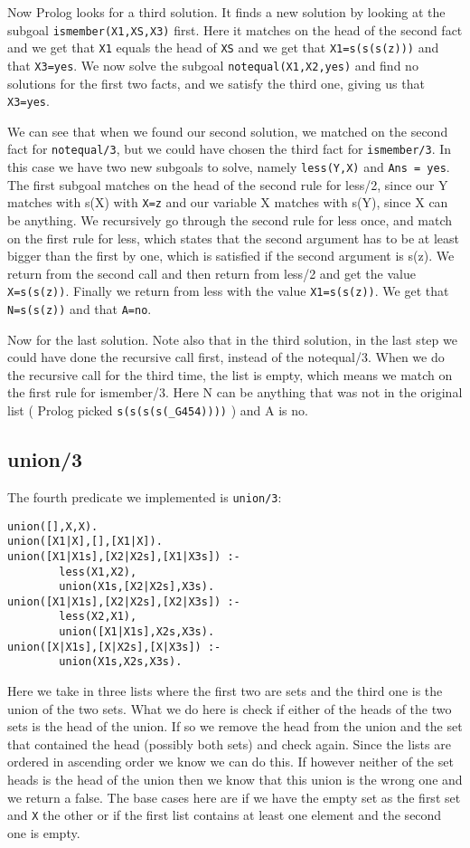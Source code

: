 \documentclass[a4paper,10pt]{article}
\begin{document}
Now Prolog looks for a third solution. It finds a new solution by looking at the subgoal \verb=ismember(X1,XS,X3)= first. Here it matches on the head of the second fact and we get that \verb=X1= equals the head of \verb=XS= and we get that \verb!X1=s(s(s(z)))! and that \verb!X3=yes!. We now solve the subgoal \verb=notequal(X1,X2,yes)= and find no solutions for the first two facts, and we satisfy the third one, giving us that \verb!X3=yes!.

We can see that when we found our second solution, we matched on the second fact for \verb=notequal/3=, but we could have chosen the third fact for \verb=ismember/3=. In this case we have two new subgoals to solve, namely \verb=less(Y,X)= and \verb!Ans = yes!. The first subgoal matches on the head of the second rule for less/2, since our Y matches with s(X) with \verb!X=z! and our variable X matches with s(Y), since X can be anything. We recursively go through the second rule for less once, and match on the first rule for less, which states that the second argument has to be at least bigger than the first by one, which is satisfied if the second argument is s(z). We return from the second call and then return from less/2 and get the value \verb!X=s(s(z))!. Finally we return from less with the value \verb!X1=s(s(z))!. We get that \verb!N=s(s(z))! and that \verb!A=no!.

Now for the last solution. Note also that in the third solution, in the last step we could have done the recursive call first, instead of the notequal/3. When we do the recursive call for the third time, the list is empty, which means we match on the first rule for ismember/3. Here N can be anything that was not in the original list ( Prolog picked \verb=s(s(s(s(_G454))))= ) and A is no.

\subsection{union/3}
The fourth predicate we implemented is \verb=union/3=:
\begin{verbatim}
union([],X,X).
union([X1|X],[],[X1|X]).
union([X1|X1s],[X2|X2s],[X1|X3s]) :-
        less(X1,X2),
        union(X1s,[X2|X2s],X3s).
union([X1|X1s],[X2|X2s],[X2|X3s]) :-
        less(X2,X1),
        union([X1|X1s],X2s,X3s).
union([X|X1s],[X|X2s],[X|X3s]) :-
        union(X1s,X2s,X3s).
\end{verbatim}
Here we take in three lists where the first two are sets and the third one is the union of the two sets. What we do here is check if either of the heads of the two sets is the head of the union. If so we remove the head from the union and the set that contained the head (possibly both sets) and check again. Since the lists are ordered in ascending order we know we can do this. If however neither of the set heads is the head of the union then we know that this union is the wrong one and we return a false. The base cases here are if we have the empty set as the first set and \verb=X= the other or if the first list contains at least one element and the second one is empty.
\end{document}
